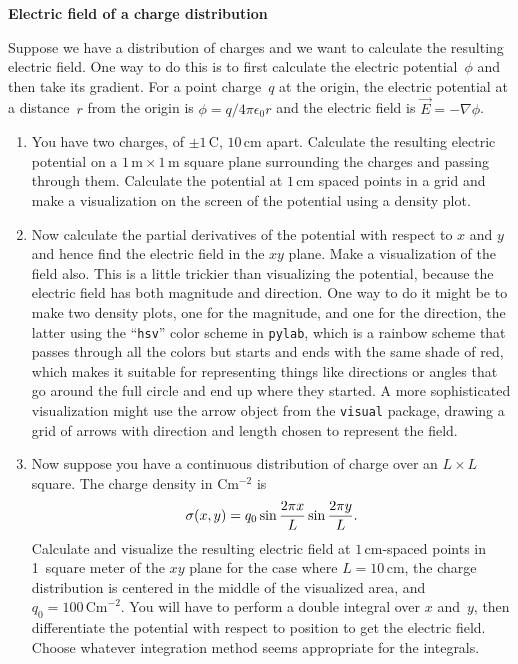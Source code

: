 \documentclass[12pt]{article}
\begin{document}
\begin{exercises}

\exercise \textbf{Electric field of a charge distribution}

\exskip Suppose we have a distribution of charges and we want to calculate
the resulting electric field.  One way to do this is to first calculate the
electric potential~$\phi$ and then take its gradient.  For a point
charge~$q$ at the origin, the electric potential at a distance~$r$ from the
origin is $\phi=q/4\pi\epsilon_0 r$ and the electric field is $\vec{E} =
-\nabla\phi$.
\begin{enumerate}\setlength{\itemsep}{0pt}
\item You have two charges, of $\pm1\,$C, $10\,$cm apart.  Calculate the
  resulting electric potential on a $1\,\textrm{m}\times1\,\textrm{m}$
  square plane surrounding the charges and passing through them.  Calculate
  the potential at $1\,$cm spaced points in a grid and make a
  visualization on the screen of the potential using a density plot.
\item Now calculate the partial derivatives of the potential with respect
  to $x$ and $y$ and hence find the electric field in the $xy$ plane.  Make
  a visualization of the field also.  This is a little trickier than
  visualizing the potential, because the electric field has both magnitude
  and direction.  One way to do it might be to make two density plots, one
  for the magnitude, and one for the direction, the latter using the
  ``\verb|hsv|'' color scheme in \verb|pylab|, which is a rainbow scheme
  that passes through all the colors but starts and ends with the same
  shade of red, which makes it suitable for representing things like
  directions or angles that go around the full circle and end up where they
  started.  A more sophisticated visualization might use the arrow
  object from the \verb|visual| package, drawing a grid of arrows with
  direction and length chosen to represent the field.
\item Now suppose you have a continuous distribution of charge over an
  $L\times L$ square.  The charge density in Cm$^{-2}$ is
\begin{displaymath}
\sigma(x,y) = q_0 \sin {2\pi x\over L} \sin{2\pi y\over L}.
\end{displaymath}
Calculate and visualize the resulting electric field at $1\,$cm-spaced
points in 1~square meter of the $xy$ plane for the case where $L=10\,$cm,
the charge distribution is centered in the middle of the visualized area,
and $q_0=100\,\textrm{Cm}^{-2}$.  You will have to perform a double
integral over $x$ and~$y$, then differentiate the potential with respect to
position to get the electric field.  Choose whatever integration method
seems appropriate for the integrals.
\end{enumerate}



\end{exercises}
\end{document}

